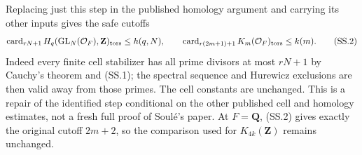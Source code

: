 Replacing just this step in the published homology argument
and carrying its other inputs gives the safe cutoffs
\[
 \operatorname{card}_{rN+1}
 H_q(\operatorname{GL}_N(\mathcal O_F),\mathbf Z)_{\rm tors}
       \leq h(q,N),\qquad
 \operatorname{card}_{r(2m+1)+1}
 K_m(\mathcal O_F)_{\rm tors}\leq k(m).
                                                               \tag{SS.2}
\]
Indeed every finite cell stabilizer has all prime divisors
at most $rN+1$ by Cauchy's theorem and (SS.1); the spectral
sequence and Hurewicz exclusions are then valid away from
those primes. The cell constants are unchanged. This is
a repair of the identified step conditional on the other
published cell and homology estimates, not a fresh full
proof of Soul\'e's paper. At $F=\mathbf Q$, (SS.2) gives
exactly the original cutoff $2m+2$, so the comparison used
for $K_{4k}(\mathbf Z)$ remains unchanged.

